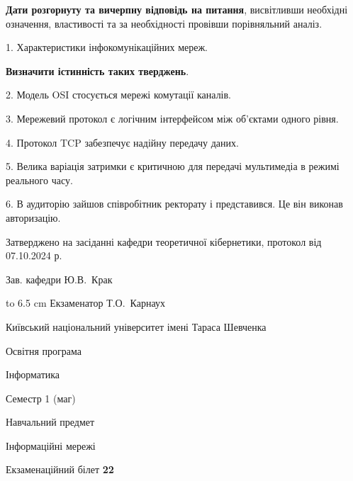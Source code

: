 \documentclass[12pt, ukrainian]{article}
\begin{document}
{
\qquad\textbf{Дати розгорнуту та вичерпну відповідь на питання}, висвітливши необхідні означення, властивості та за необхідності провівши порівняльний аналіз.

1. Характеристики інфокомунікаційних мереж.



\qquad\textbf{Визначити істинність таких тверджень}.

2. Модель OSI стосується мережі комутації каналів.


3. Мережевий протокол є логічним інтерфейсом між об'єктами одного рівня.


4. Протокол TCP забезпечує надійну передачу даних.


5. Велика варіація затримки є критичною для передачі мультимедіа в режимі реального часу.


6. В аудиторію зайшов співробітник ректорату і представився. Це він виконав авторизацію.

}
{\smallskip\smallskip \begin {scriptsize} Затверджено на засіданні кафедри теоретичної кібернетики, протокол   від   07.10.2024 р.\par\smallskip\smallskip\smallskip\smallskip
{\parbox {6.5 cm} {Зав. кафедри \dotfill Ю.В.~Крак}}\hspace {0.7cm} {\hbox to 6.5 cm { Екзаменатор \dotfill Т.О.~Карнаух}} \end{scriptsize}}
\newpage
{{\begin {scriptsize}\par
{ \center  Київський національний університет імені Тараса Шевченка \par}
{\parbox {5 cm}{Освітня програма \hfill}{\parbox {7 cm}{Інформатика\hfill}}\parbox {6 cm}{\hfill Семестр 1 (маг)}}\par
{\parbox {5 cm} {Навчальний предмет \hfill}\parbox {7 cm}{Інформаційні мережі \hfill}\parbox {6cm}{\hfill}\par}\vspace{-15pt} \end{scriptsize}}{\center Екзаменаційний білет \No \textbf { 22 }\par}}
\end{document}
